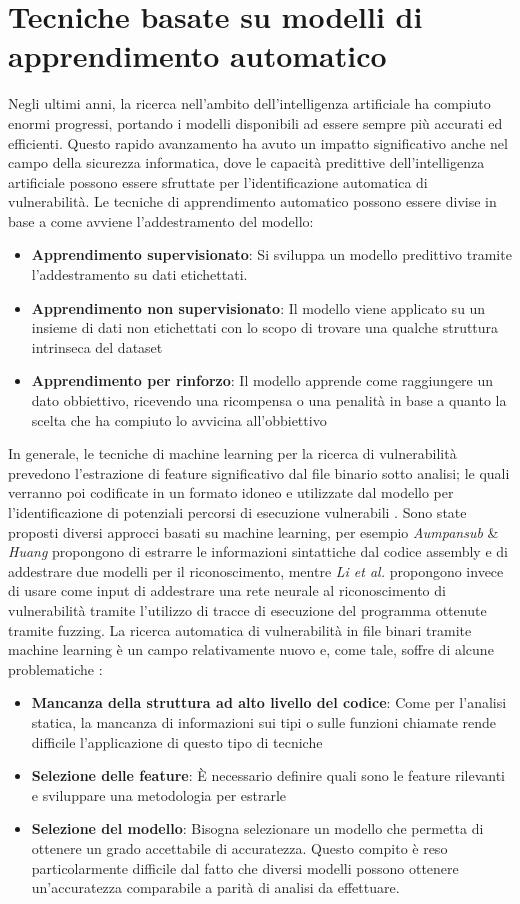 \documentclass[../main.tex]{subfiles}
\begin{document}
\section{Tecniche basate su modelli di apprendimento automatico}
Negli ultimi anni, la ricerca nell'ambito dell'intelligenza artificiale ha compiuto enormi progressi, portando i modelli disponibili ad essere
sempre più accurati ed efficienti. Questo rapido avanzamento ha avuto un impatto significativo anche nel campo della sicurezza informatica, dove
le capacità predittive dell'intelligenza artificiale possono essere sfruttate per l'identificazione automatica di vulnerabilità.
Le tecniche di apprendimento automatico possono essere divise in base a come avviene l'addestramento del modello:
\begin{itemize}
    \item \textbf{Apprendimento supervisionato}: Si sviluppa un modello predittivo tramite l'addestramento su dati etichettati.
    \item \textbf{Apprendimento non supervisionato}: Il modello viene applicato su un insieme di dati non etichettati con lo scopo di trovare una qualche struttura intrinseca del dataset
    \item \textbf{Apprendimento per rinforzo}: Il modello apprende come raggiungere un dato obbiettivo, ricevendo una ricompensa o una penalità in base a quanto la scelta che ha compiuto lo avvicina all'obbiettivo
\end{itemize}
In generale, le tecniche di machine learning per la ricerca di vulnerabilità prevedono l'estrazione di feature significativo dal file binario sotto analisi; le quali verranno poi codificate in un formato idoneo e utilizzate
dal modello per l'identificazione di potenziali percorsi di esecuzione vulnerabili \cite{ML_Survey}.
Sono state proposti diversi approcci basati su machine learning, per esempio \textit{Aumpansub} \& \textit{Huang} \cite{ML1} propongono di estrarre le informazioni sintattiche dal codice assembly e di addestrare
due modelli per il riconoscimento, mentre \textit{Li et al.} \cite{DeepVL} propongono invece di usare come input di addestrare una rete neurale al riconoscimento di vulnerabilità tramite l'utilizzo di tracce di esecuzione del programma ottenute tramite fuzzing.
La ricerca automatica di vulnerabilità in file binari tramite machine learning è un campo relativamente nuovo e, come tale, soffre di alcune problematiche \cite{ML2}:
\begin{itemize}
    \item \textbf{Mancanza della struttura ad alto livello del codice}: Come per l'analisi statica, la mancanza di informazioni sui tipi o sulle funzioni chiamate rende difficile l'applicazione di questo tipo di tecniche
    \item \textbf{Selezione delle feature}: È necessario definire quali sono le feature rilevanti e sviluppare una metodologia per estrarle
    \item \textbf{Selezione del modello}: Bisogna selezionare un modello che permetta di ottenere un grado accettabile di accuratezza. Questo compito è reso particolarmente difficile dal fatto che diversi modelli possono ottenere un'accuratezza comparabile a parità di analisi da effettuare.  
\end{itemize}
\end{document}
